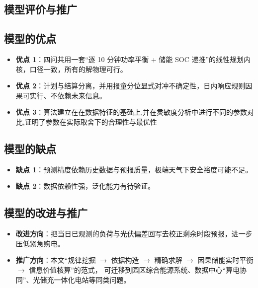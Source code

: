 \documentclass[withoutpreface,bwprint]{cumcmthesis}
\begin{document}
\begin{enumerate}[label=(\arabic*), leftmargin=2.4em, itemsep=1pt]
\section{模型评价与推广}

\subsection{模型的优点}

\begin{itemize}[leftmargin=2.2em, itemsep=2pt]
\item \textbf{优点 1}：四问共用一套“逐 10 分钟功率平衡 + 储能 SOC 递推”的线性规划内核，口径一致，所有的解物理可行。
\item \textbf{优点 2}：计划与结算分离，并用报童分位显式对冲不确定性，日内响应规则因果可实行、不依赖未来信息。
\item \textbf{优点 3}：算法建立在在数据特征的基础上,并在灵敏度分析中进行不同的参数对比,证明了参数在实际取舍下的合理性与最优性
\end{itemize}

\subsection{模型的缺点}

\begin{itemize}[leftmargin=2.2em, itemsep=2pt]
\item \textbf{缺点 1}：预测精度依赖历史数据与预报质量，极端天气下安全裕度可能不足。
\item \textbf{缺点 2}：数据依赖性强，泛化能力有待验证。
\end{itemize}

\subsection{模型的改进与推广}

\begin{itemize}[leftmargin=2.2em, itemsep=2pt]
\item \textbf{改进方向}：把当日已观测的负荷与光伏偏差回写去校正剩余时段预报，进一步压低紧急购电。
\item \textbf{推广方向}：本文“规律挖掘 $\to$ 依据构造 $\to$ 精确求解 $\to$ 因果储能实时平衡 $\to$ 信息价值核算”的范式，
可迁移到园区综合能源系统、数据中心“算电协同”、光储充一体化电站等同类问题。
\end{itemize}





\end{enumerate}
\end{document}
